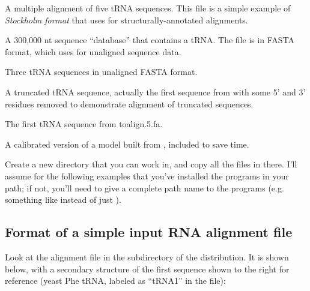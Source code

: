  \begin{sreitems}{}
  \item[\prog{trna.5.sto}] A multiple alignment of five tRNA
       sequences. This file is a simple example of \emph{Stockholm
       format} that  uses for structurally-annotated alignments.
  \item[\prog{tosearch.300Kb.db}]  A 300,000 nt sequence ``database''
       that contains a tRNA. The file is
       in FASTA format, which  uses for unaligned sequence
       data.
  \item[\prog{toalign.3.fa}] Three tRNA sequences
    in unaligned FASTA format.
  \item[\prog{toalign.1trunc.fa}] A truncated tRNA sequence, actually
       the first sequence from  with some 5' and 3'
       residues removed to demonstrate alignment of truncated
       sequences.
  \item[\prog{toalign.1.fa}] The first tRNA sequence from toalign.5.fa.
  \item[\prog{trna.5.c.cm}] A calibrated version of a model built from
       , included to save time. 
  \end{sreitems}

Create a new directory that you can work in, and copy all the files in
 there. I'll assume for the following examples that you've
installed the  programs in your path; if not, you'll need to give
a complete path name to the programs (e.g. something like 
\newline
{} 
instead of just ).

\subsection{Format of a simple input RNA alignment file}

Look at the alignment file  in the 
subdirectory of the  distribution. It is shown
below, with a secondary structure of the first sequence shown to the
right for reference (yeast Phe tRNA, labeled as ``tRNA1'' in the
file):

